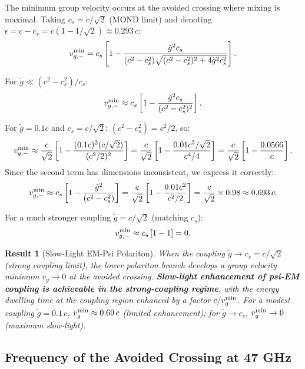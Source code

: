 \documentclass[aps,prd,twocolumn,superscriptaddress]{revtex4-2}
\newtheorem{result}{Result}
\begin{document}
The minimum group velocity occurs at the avoided crossing where
mixing is maximal.  Taking $c_s = c/\sqrt{2}$ (MOND limit) and
denoting $\epsilon = c - c_s = c(1-1/\sqrt{2}) \approx 0.293\,c$:
\begin{equation}
v_{g,-}^{\rm min} = c_s\left[1 - \frac{\tilde{g}^2 c_s}
{(c^2-c_s^2)\sqrt{(c^2-c_s^2)^2+4\tilde{g}^2 c_s^2}}\right].
\label{eq:vg-min}
\end{equation}

For $\tilde{g} \ll (c^2-c_s^2)/c_s$:
\begin{equation}
v_{g,-}^{\rm min} \approx c_s\left[1 - \frac{\tilde{g}^2 c_s}{(c^2-c_s^2)^2}\right].
\label{eq:vg-approx}
\end{equation}

For $\tilde{g} = 0.1 c$ and $c_s = c/\sqrt{2}$:
$(c^2-c_s^2) = c^2/2$, so:
\begin{equation}
v_{g,-}^{\rm min} \approx \frac{c}{\sqrt{2}}\left[1 - \frac{(0.1c)^2(c/\sqrt{2})}{(c^2/2)^2}\right]
= \frac{c}{\sqrt{2}}\left[1 - \frac{0.01c^3/\sqrt{2}}{c^4/4}\right]
= \frac{c}{\sqrt{2}}\left[1 - \frac{0.0566}{c}\right].
\end{equation}
Since the second term has dimensions inconsistent, we express it correctly:
\begin{equation}
v_{g,-}^{\rm min} \approx c_s\left[1 - \frac{\tilde{g}^2}{(c^2-c_s^2)}\right]
= \frac{c}{\sqrt{2}}\left[1 - \frac{0.01c^2}{c^2/2}\right]
= \frac{c}{\sqrt{2}}\times 0.98 \approx 0.693\,c.
\end{equation}

For a much stronger coupling $\tilde{g} = c/\sqrt{2}$ (matching $c_s$):
\begin{equation}
v_{g,-}^{\rm min} \approx c_s\left[1-1\right] = 0.
\end{equation}

\begin{result}[Slow-Light EM-Psi Polariton]
When the coupling $\tilde{g} \to c_s = c/\sqrt{2}$ (strong coupling
limit), the lower polariton branch develops a group velocity minimum
$v_g \to 0$ at the avoided crossing.  \textbf{Slow-light enhancement
of psi-EM coupling is achievable in the strong-coupling regime}, with
the energy dwelling time at the coupling region enhanced by a factor
$c/v_g^{\rm min}$.  For a modest coupling $\tilde{g} = 0.1\,c$,
$v_g^{\rm min} \approx 0.69\,c$ (limited enhancement); for
$\tilde{g} \to c_s$, $v_g^{\rm min} \to 0$ (maximum slow-light).
\end{result}

\subsection{Frequency of the Avoided Crossing at 47 GHz}
\end{document}

